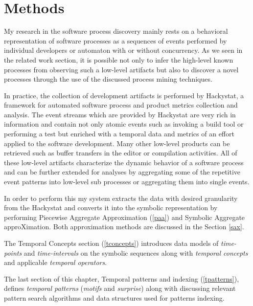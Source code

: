 \chapter{Methods} \label{methods}
My research in the software process discovery mainly rests on a behavioral representation of software processes as a sequences of events performed by individual developers or automaton with or without concurrency. As we seen in the related work section, it is possible not only to infer the high-level known processes from observing such a low-level artifacts but also to discover a novel processes through the use of the discussed process mining techniques. 

In practice, the collection of development artifacts is performed by Hackystat, a framework for automated software process and product metrics collection and analysis. The event streams which are provided by Hackystat are very rich in information and contain not only atomic events such as invoking a build tool or performing a test but enriched with a temporal data and metrics of an effort applied to the software development. Many other low-level products can be retrieved such as buffer transfers in the editor or compilation activities. All of these low-level artifacts characterize the dynamic behavior of a software process and can be further extended for analyses by aggregating some of the repetitive event patterns into low-level sub processes or aggregating them into single events.

In order to perform this my system extracts the data with desired granularity from the Hackystat and converts it into the symbolic representation by performing Piecewise Aggregate Approximation (\ref{paa}) and Symbolic Aggregate approXimation.  Both approximation methods are discussed in the Section \ref{sax}.

The Temporal Concepts section (\ref{tconcepts}) introduces data models of \textit{time-points} and \textit{time-intervals} on the symbolic sequences along with \textit{temporal concepts} and applicable \textit{temporal operators}. 

The last section of this chapter, Temporal patterns and indexing (\ref{tpatterns}), defines \textit{temporal patterns} (\textit{motifs} and \textit{surprise}) along with discussing relevant pattern search algorithms and data structures used for patterns indexing.